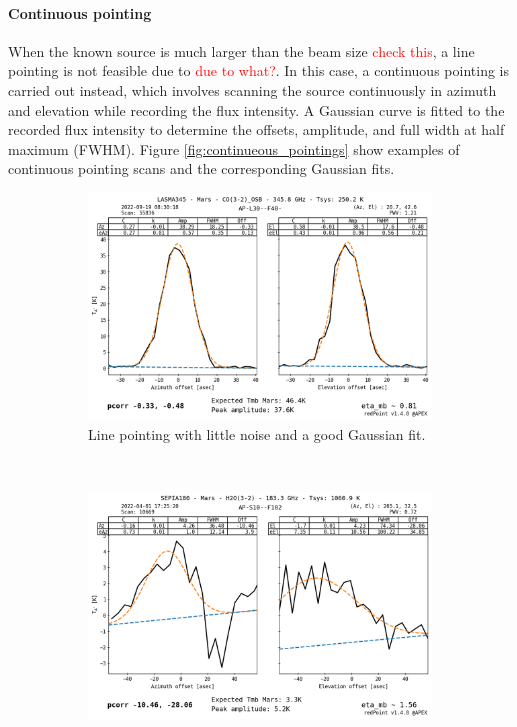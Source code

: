 \paragraph{Continuous pointing}
When the known source is much larger than the beam size \textcolor{red}{check this}, a line pointing is not feasible due to \textcolor{red}{due to what?}.
In this case, a continuous pointing is carried out instead, which involves scanning the source continuously in azimuth and elevation while recording the flux intensity.
A Gaussian curve is fitted to the recorded flux intensity to determine the offsets, amplitude, and full width at half maximum (FWHM).
Figure \ref{fig:continueous_pointings} show examples of continuous pointing scans and the corresponding Gaussian fits.

\begin{figure}[H]
    \centering
     \begin{subfigure}[b]{0.75\textwidth}
         \centering
         \includegraphics[width=\textwidth]{Pointing Scans/good_continuous.png}
         \caption{Line pointing with little noise and a good Gaussian fit.}
         \label{subfig:good_continuous}
     \end{subfigure}
    \\
     \begin{subfigure}[b]{0.75\textwidth}
         \centering
         \includegraphics[width=\textwidth]{Pointing Scans/bad_continuous.png}

\end{subfigure}
\end{figure}
